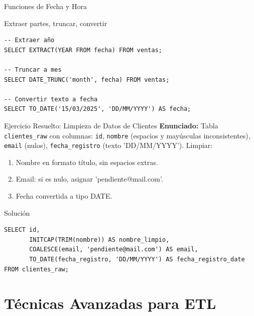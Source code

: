 \documentclass[aspectratio=169, 10pt, xcolor=table]{beamer}
\begin{document}
\begin{frame}[fragile]{Funciones de Fecha y Hora}
    \begin{block}{Extraer partes, truncar, convertir}
        \begin{lstlisting}
-- Extraer año
SELECT EXTRACT(YEAR FROM fecha) FROM ventas;

-- Truncar a mes
SELECT DATE_TRUNC('month', fecha) FROM ventas;

-- Convertir texto a fecha
SELECT TO_DATE('15/03/2025', 'DD/MM/YYYY') AS fecha;
        \end{lstlisting}
    \end{block}
\end{frame}

\begin{frame}[fragile]{Ejercicio Resuelto: Limpieza de Datos de Clientes}
    \textbf{Enunciado:} Tabla \texttt{clientes\_raw} con columnas: \texttt{id}, \texttt{nombre} (espacios y mayúsculas inconsistentes), \texttt{email} (nulos), \texttt{fecha\_registro} (texto 'DD/MM/YYYY'). Limpiar:
    \begin{enumerate}
        \item Nombre en formato título, sin espacios extras.
        \item Email: si es nulo, asignar 'pendiente@mail.com'.
        \item Fecha convertida a tipo DATE.
    \end{enumerate}
    \begin{block}{Solución}
        \begin{lstlisting}
SELECT id,
       INITCAP(TRIM(nombre)) AS nombre_limpio,
       COALESCE(email, 'pendiente@mail.com') AS email,
       TO_DATE(fecha_registro, 'DD/MM/YYYY') AS fecha_registro_date
FROM clientes_raw;
        \end{lstlisting}
    \end{block}
\end{frame}

\section{Técnicas Avanzadas para ETL}
\end{document}
